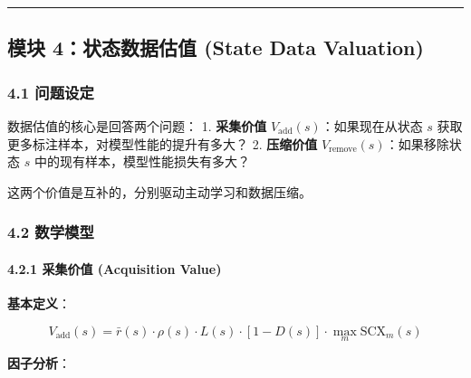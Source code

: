 \documentclass[
  12pt,
]{ctexart}
\begin{document}
\begin{center}\rule{0.5\linewidth}{0.5pt}\end{center}

\subsection{模块 4：状态数据估值 (State Data
Valuation)}\label{ux6a21ux5757-4ux72b6ux6001ux6570ux636eux4f30ux503c-state-data-valuation}

\subsubsection{4.1 问题设定}\label{ux95eeux9898ux8bbeux5b9a-3}

数据估值的核心是回答两个问题： 1. \textbf{采集价值}
\(V_{\text{add}}(s)\)：如果现在从状态 \(s\)
获取更多标注样本，对模型性能的提升有多大？ 2. \textbf{压缩价值}
\(V_{\text{remove}}(s)\)：如果移除状态 \(s\)
中的现有样本，模型性能损失有多大？

这两个价值是互补的，分别驱动主动学习和数据压缩。

\subsubsection{4.2 数学模型}\label{ux6570ux5b66ux6a21ux578b-3}

\paragraph{4.2.1 采集价值 (Acquisition
Value)}\label{ux91c7ux96c6ux4ef7ux503c-acquisition-value}

\textbf{基本定义}：

\[
V_{\text{add}}(s) = \bar{r}(s) \cdot \rho(s) \cdot L(s) \cdot [1 - D(s)] \cdot \max_m \text{SCX}_m(s)
\]

\textbf{因子分析}：
\end{document}

